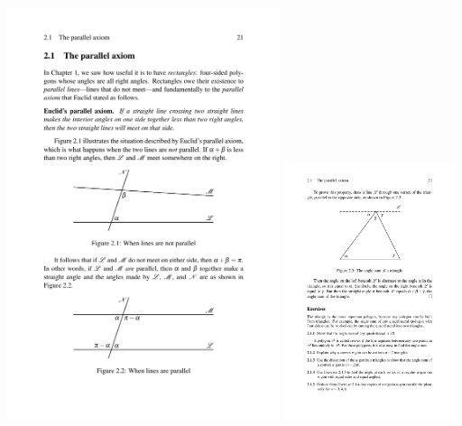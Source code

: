 \centerline{
\includegraphics[width=8cm]{BILDER/BildParallelenaxiom2.pdf}
\hspace*{1cm}
\includegraphics[width=5cm]{BILDER/BildInnenwinkelsatz.pdf}
}





